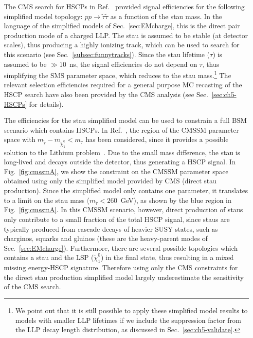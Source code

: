The CMS search for HSCPs in Ref.~\cite{Khachatryan:2015lla}
provided signal efficiencies for the following simplified model topology:
$ pp \to \tilde{\tau} \tilde{\tau}$ as a function of the
stau mass. In the language of the simplified models of Sec.~\ref{sec:EMcharge},
this is the direct pair production mode of a charged LLP.
 The stau is assumed to be stable (at detector scales), thus
producing a highly ionizing track, which can be used to search
for this scenario (see Sec.~\ref{subsec:funnytracks}). 
Since the stau lifetime ($\tau$) is assumed to be $\gg
10$~ns, the signal efficiencies do not depend on $\tau$,
thus simplifying the SMS parameter space, which reduces to the stau
mass.\footnote{We point out that it is still possible to apply these simplified
model results to models with smaller LLP lifetimes if we include the suppression
factor from the LLP decay length distribution, as
discussed in Sec.~\ref{sec:ch5-validate}.
}
The relevant selection efficiencies required for a general purpose
MC recasting of the HSCP search have also been provided by
the CMS analysis (see Sec.~\ref{sec:ch5-HSCPs} for details).


The efficiencies for the stau simplified model
can be used to constrain a full BSM scenario which contains
HSCPs. In Ref.~\cite{Heisig:2015yla}, the region of the CMSSM parameter
space with $m_{\tilde \tau} - m_{\tilde \chi_1^0} < m_{\tau}$ has been
considered, since it provides a possible solution to the Lithium
problem~\cite{Spite:1982dd, Cyburt:2008kw}. Due to the small
mass difference, the stau is long-lived and decays outside the detector,
thus generating a HSCP signal.
In Fig.~\ref{fig:cmssmA}, we show the constraint on the CMSSM parameter
space obtained using only the simplified model provided by CMS (direct stau
production).
Since the simplified model only contains one parameter, it
translates to a limit on the stau mass ($m_{\tilde \tau} < 260$~GeV),
as shown by the blue region in Fig.~\ref{fig:cmssmA}.
In this CMSSM scenario, however, direct production of staus only contribute to a
small fraction of the total HSCP signal, since staus are typically produced from
cascade decays of heavier SUSY states, such as charginos, squarks and gluinos 
(these are the heavy-parent modes of Sec.~\ref{sec:EMcharge}).
Furthermore, there are several possible topologies which contains a stau and the
LSP ($\tilde \chi_1^0$) in the final state, thus resulting in a
mixed missing energy-HSCP signature.
Therefore using only the CMS constraints for the direct stau production
simplified model largely underestimate the sensitivity of the CMS
search. 


